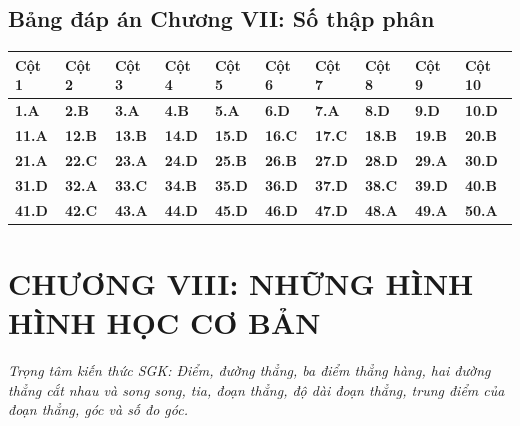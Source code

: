 \documentclass[11pt,a4paper]{article}
\begin{document}
\subsection*{\color{primary} Bảng đáp án Chương VII: Số thập phân}
\begin{center}
\renewcommand{\arraystretch}{1.25}
\begin{tabularx}{\textwidth}{*{10}{>{\centering\arraybackslash}X}}
\toprule
\textbf{\color{primary} Cột 1} & \textbf{\color{primary} Cột 2} & \textbf{\color{primary} Cột 3} & \textbf{\color{primary} Cột 4} & \textbf{\color{primary} Cột 5} & \textbf{\color{primary} Cột 6} & \textbf{\color{primary} Cột 7} & \textbf{\color{primary} Cột 8} & \textbf{\color{primary} Cột 9} & \textbf{\color{primary} Cột 10} \\
\midrule
\textbf{1.A} & \textbf{2.B} & \textbf{3.A} & \textbf{4.B} & \textbf{5.A} & \textbf{6.D} & \textbf{7.A} & \textbf{8.D} & \textbf{9.D} & \textbf{10.D} \\
\rowcolor{rowtint} \textbf{11.A} & \textbf{12.B} & \textbf{13.B} & \textbf{14.D} & \textbf{15.D} & \textbf{16.C} & \textbf{17.C} & \textbf{18.B} & \textbf{19.B} & \textbf{20.B} \\
\textbf{21.A} & \textbf{22.C} & \textbf{23.A} & \textbf{24.D} & \textbf{25.B} & \textbf{26.B} & \textbf{27.D} & \textbf{28.D} & \textbf{29.A} & \textbf{30.D} \\
\rowcolor{rowtint} \textbf{31.D} & \textbf{32.A} & \textbf{33.C} & \textbf{34.B} & \textbf{35.D} & \textbf{36.D} & \textbf{37.D} & \textbf{38.C} & \textbf{39.D} & \textbf{40.B} \\
\textbf{41.D} & \textbf{42.C} & \textbf{43.A} & \textbf{44.D} & \textbf{45.D} & \textbf{46.D} & \textbf{47.D} & \textbf{48.A} & \textbf{49.A} & \textbf{50.A} \\
\bottomrule
\end{tabularx}
\end{center}\vspace{10pt}
\section*{\color{primary} CHƯƠNG VIII: NHỮNG HÌNH HÌNH HỌC CƠ BẢN}
\textit{Trọng tâm kiến thức SGK: Điểm, đường thẳng, ba điểm thẳng hàng, hai đường thẳng cắt nhau và song song, tia, đoạn thẳng, độ dài đoạn thẳng, trung điểm của đoạn thẳng, góc và số đo góc.}\par\vspace{4pt}
\end{document}
